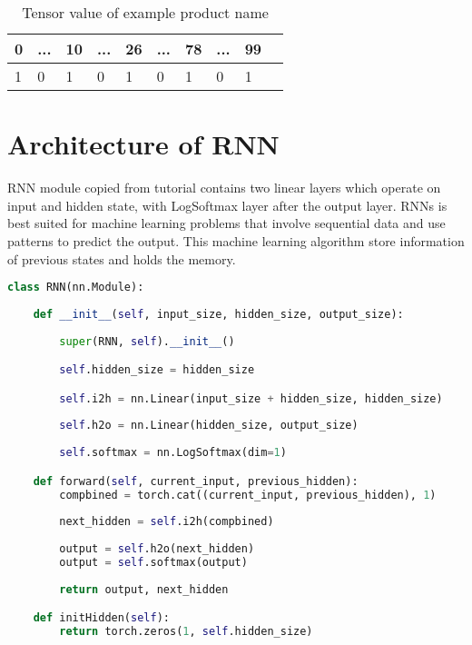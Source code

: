 \begin{table}[htp!]
    \centering
    \caption{Tensor value of example product name}
    \label{table:tensorvalue}
    \begin{tabular}{ llllllllll }
          \toprule
          
          \textbf{0} & \textbf{...}& \textbf{10}&\textbf{...}&\textbf{26}&\textbf{...}&\textbf{78}&\textbf{...}&\textbf{99}\\
          \midrule
          1 & 0& 1& 0&1& 0& 1 & 0& 1\\
                 
        
          \bottomrule
          \end{tabular}
\end{table}

\section{Architecture of \acf{RNN}}
\acs{RNN} module copied from \parencite{sean} tutorial contains two linear layers which operate on input and hidden state, with LogSoftmax layer after the output layer. \acfp{RNN} \parencite{Rumelhart.1986} is best suited for machine learning problems that involve sequential data and use patterns to predict the output. This machine learning algorithm store information of previous states and holds the memory. 
\begin{lstlisting}[language=Python,label=code:RNN-class, caption={\acf{RNN} class}]
class RNN(nn.Module):
        
    def __init__(self, input_size, hidden_size, output_size):
        
        super(RNN, self).__init__()

        self.hidden_size = hidden_size

        self.i2h = nn.Linear(input_size + hidden_size, hidden_size)
        
        self.h2o = nn.Linear(hidden_size, output_size)
        
        self.softmax = nn.LogSoftmax(dim=1)

    def forward(self, current_input, previous_hidden):
        compbined = torch.cat((current_input, previous_hidden), 1)
        
        next_hidden = self.i2h(compbined)
        
        output = self.h2o(next_hidden)
        output = self.softmax(output)
        
        return output, next_hidden

    def initHidden(self):
        return torch.zeros(1, self.hidden_size)
\end{lstlisting}

